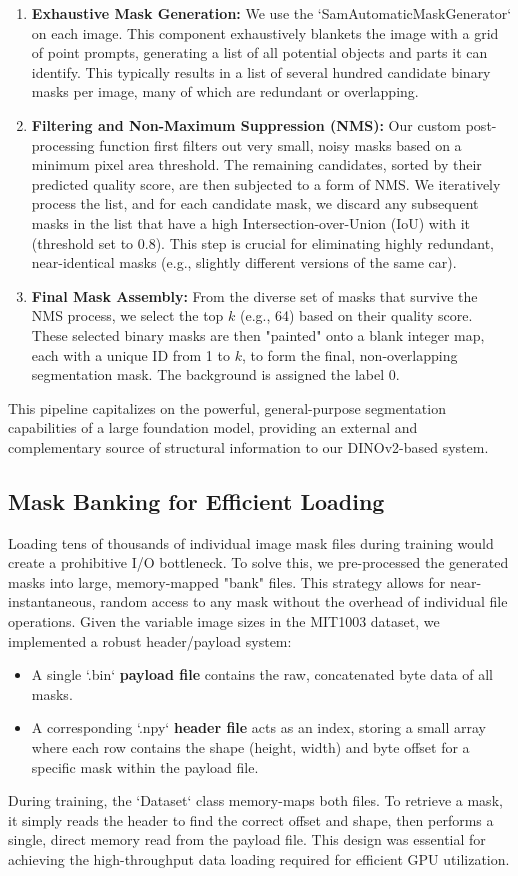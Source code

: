 \begin{enumerate}
    \item \textbf{Exhaustive Mask Generation:} We use the `SamAutomaticMaskGenerator` on each image. This component exhaustively blankets the image with a grid of point prompts, generating a list of all potential objects and parts it can identify. This typically results in a list of several hundred candidate binary masks per image, many of which are redundant or overlapping.
    \item \textbf{Filtering and Non-Maximum Suppression (NMS):} Our custom post-processing function first filters out very small, noisy masks based on a minimum pixel area threshold. The remaining candidates, sorted by their predicted quality score, are then subjected to a form of NMS. We iteratively process the list, and for each candidate mask, we discard any subsequent masks in the list that have a high Intersection-over-Union (IoU) with it (threshold set to 0.8). This step is crucial for eliminating highly redundant, near-identical masks (e.g., slightly different versions of the same car).
    \item \textbf{Final Mask Assembly:} From the diverse set of masks that survive the NMS process, we select the top $k$ (e.g., 64) based on their quality score. These selected binary masks are then "painted" onto a blank integer map, each with a unique ID from 1 to $k$, to form the final, non-overlapping segmentation mask. The background is assigned the label 0.
\end{enumerate}
This pipeline capitalizes on the powerful, general-purpose segmentation capabilities of a large foundation model, providing an external and complementary source of structural information to our DINOv2-based system.

\subsection{Mask Banking for Efficient Loading}
Loading tens of thousands of individual image mask files during training would create a prohibitive I/O bottleneck. To solve this, we pre-processed the generated masks into large, memory-mapped "bank" files. This strategy allows for near-instantaneous, random access to any mask without the overhead of individual file operations. Given the variable image sizes in the MIT1003 dataset, we implemented a robust header/payload system:
\begin{itemize}
    \item A single `.bin` \textbf{payload file} contains the raw, concatenated byte data of all masks.
    \item A corresponding `.npy` \textbf{header file} acts as an index, storing a small array where each row contains the shape (height, width) and byte offset for a specific mask within the payload file.
\end{itemize}
During training, the `Dataset` class memory-maps both files. To retrieve a mask, it simply reads the header to find the correct offset and shape, then performs a single, direct memory read from the payload file. This design was essential for achieving the high-throughput data loading required for efficient GPU utilization.





